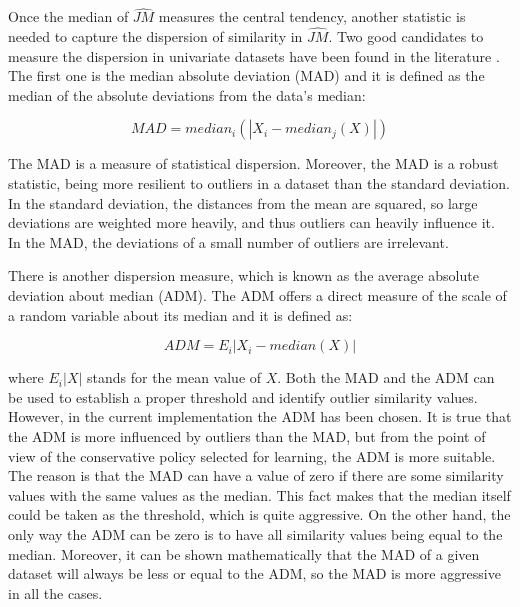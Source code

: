 
Once the median of $\hat{JM}$ measures the central tendency, another statistic is needed to capture the dispersion of similarity in $\hat{JM}$. Two good candidates to measure the dispersion in univariate datasets have been found in the literature \cite{Hoaglin1983}. The first one is the median absolute deviation (MAD) and it is defined as the median of the absolute deviations from the data's median:

\begin{equation}
\label{eq-mad}
 MAD = median_i (|X_i - median_j(X)|)
\end{equation}

The MAD is a measure of statistical dispersion. Moreover, the MAD is a robust statistic, being more resilient to outliers in a dataset than the standard deviation. In the standard deviation, the distances from the mean are squared, so large deviations are weighted more heavily, and thus outliers can heavily influence it. In the MAD, the deviations of a small number of outliers are irrelevant.

There is another dispersion measure, which is known as the average absolute deviation about median (ADM). The ADM offers a direct measure of the scale of a random variable about its median and it is defined as:

\begin{equation}
 \label{eq-adm}
 ADM = E_i |X_i - median(X)|
\end{equation}

\noindent where $E_i |X|$ stands for the mean value of $X$. Both the MAD and the ADM can be used to establish a proper threshold and identify outlier similarity values. However, in the current implementation the ADM has been chosen. It is true that the ADM is more influenced by outliers than the MAD, but from the point of view of the conservative policy selected for learning, the ADM is more suitable. The reason is that the MAD can have a value of zero if there are some similarity values with the same values as the median. This fact makes that the median itself could be taken as the threshold, which is quite aggressive. On the other hand, the only way the ADM can be zero is to have all similarity values being equal to the median. Moreover, it can be shown mathematically that the MAD of a given dataset will always be less or equal to the ADM, so the MAD is more aggressive in all the cases. 


